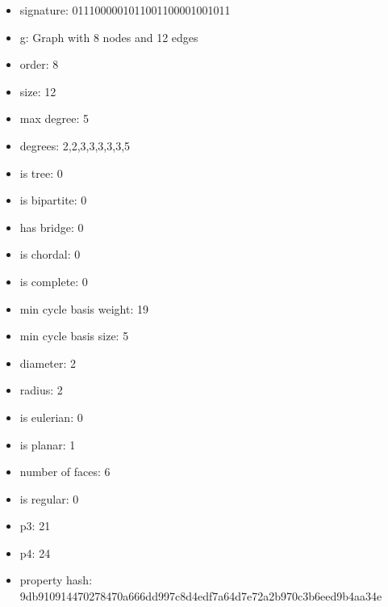 \begin{itemize}
\item signature: 0111000001011001100001001011
\item g: Graph with 8 nodes and 12 edges
\item order: 8
\item size: 12
\item max degree: 5
\item degrees: 2,2,3,3,3,3,3,5
\item is tree: 0
\item is bipartite: 0
\item has bridge: 0
\item is chordal: 0
\item is complete: 0
\item min cycle basis weight: 19
\item min cycle basis size: 5
\item diameter: 2
\item radius: 2
\item is eulerian: 0
\item is planar: 1
\item number of faces: 6
\item is regular: 0
\item p3: 21
\item p4: 24
\item property hash: 9db910914470278470a666dd997c8d4edf7a64d7e72a2b970c3b6eed9b4aa34e
\end{itemize}
\newpage
\begin{figure}
\end{figure}

